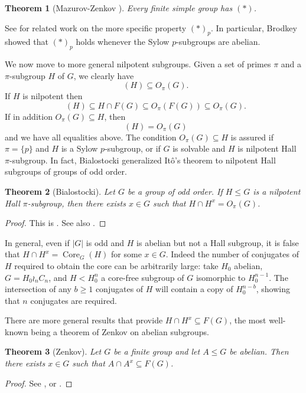 \documentclass[11pt]{amsart}
\numberwithin{equation}{section}
\newtheorem{theorem}{Theorem}[section]
\theoremstyle{definition}
\theoremstyle{remark}
\newcommand{\Core}{\mathop{\mathrm{Core}}}
\newcommand{\CoreG}{\mathop{\mathrm{Core}_G}}
\begin{document}
\begin{theorem}[Mazurov-Zenkov \cite{MZ96}] \label{thMZ}
Every finite simple group has $(*)$.
\end{theorem} 

See \cite{Bro63,Man75,Pas66,Rob84} for related work on the more specific property $(*)_p$.
In particular, Brodkey \cite{Bro63} showed that $(*)_p$
holds whenever the Sylow $p$-subgroups are abelian.

We now move to more general nilpotent subgroups.
Given a set of primes $\pi$ and a $\pi$-subgroup $H$ of $G$, we clearly have
$$ \CoreG(H) \subseteq O_\pi(G) . $$
If $H$ is nilpotent then
$$ \CoreG(H) \subseteq H \cap F(G) \subseteq O_\pi(F(G)) \subseteq O_\pi(G) . $$ 
If in addition $O_\pi(G) \subseteq H$, then
$$ \CoreG(H) = O_\pi(G) $$
and we have all equalities above.
The condition $O_\pi(G) \subseteq H$ is assured if $\pi=\{p\}$ and $H$ is a Sylow $p$-subgroup,
or if $G$ is solvable and $H$ is nilpotent Hall $\pi$-subgroup.
In fact, Bialostocki \cite{Bia75} generalized It\^o's theorem to nilpotent Hall subgroups of groups of odd order.

\begin{theorem}[Bialostocki] \label{thBialoHall}
Let $G$ be a group of odd order.
If $H \leqslant G$ is a nilpotent Hall $\pi$-subgroup, then there exists $x \in G$ such that $H \cap H^x = O_\pi(G)$.
\end{theorem}
\begin{proof}
This is \cite[Th. B.4]{Bia75}. See also \cite{Dol05}.
\end{proof} 

In general, even if $|G|$ is odd and $H$ is abelian but not a Hall subgroup,
it is false that $H \cap H^x = \Core_G(H)$ for some $x \in G$.
Indeed the number of conjugates of $H$ required to obtain the core can be arbitrarily large:
take $H_0$ abelian, $G= H_0 \wr_n C_n$,
and $H < H_0^n$ a core-free subgroup of $G$ isomorphic to $H_0^{n-1}$.
The intersection of any $b \geq 1$ conjugates of $H$ will contain a copy of $H_0^{n-b}$,
showing that $n$ conjugates are required.

There are more general results that provide $H \cap H^x \subseteq F(G)$,
 the most well-known being a theorem of Zenkov \cite{Zen94} on abelian subgroups.

\begin{theorem}[Zenkov] \label{thZenkovG}
Let $G$ be a finite group and let $A \leqslant G$ be abelian.
Then there exists $x \in G$ such that $A \cap A^x \subseteq F(G)$.
\end{theorem}
\begin{proof}
See \cite{Zen94}, or \cite[Th. 2.18]{Isa08}.
\end{proof}
\end{document}
